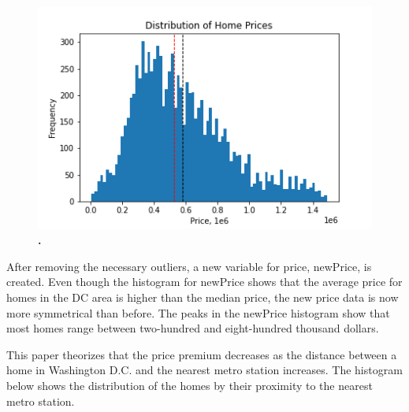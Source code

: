 \documentclass[12pt]{report}
\newcommand\tab[1][.50cm]{\hspace*{#1}}
\begin{document}
\clearpage
\begin{figure}[h]
\begin{center}
\includegraphics[width=130mm]{newPriceHist.png}
\end{center}
\caption{\textbf{.}}
\label{fig:NewpriceHist}
\end{figure}
After removing the necessary outliers, a new variable for price, newPrice, is created. Even though the histogram for newPrice shows that the average price for homes in the DC area is higher than the median price, the new price data is now more symmetrical than before. The peaks in the newPrice histogram show that most homes range between two-hundred and eight-hundred thousand dollars. \\
\clearpage

\tab This paper theorizes that the price premium decreases as the distance between a home in Washington D.C. and the nearest metro station increases. The histogram below shows the distribution of the homes by their proximity to the nearest metro station.
\end{document}
